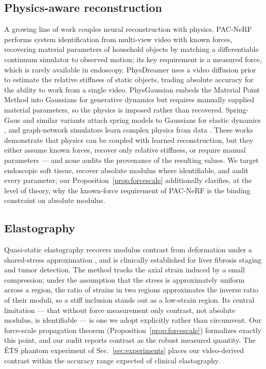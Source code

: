 \documentclass[review]{elsarticle}
\begin{document}
\subsection{Physics-aware reconstruction}
A growing line of work couples neural reconstruction with physics.
PAC-NeRF \citep{pacnerf} performs system identification from multi-view
video with known forces, recovering material parameters of household
objects by matching a differentiable continuum simulator to observed
motion; its key requirement is a measured force, which is rarely available
in endoscopy. PhysDreamer \citep{physdreamer} uses a video diffusion prior
to estimate the relative stiffness of static objects, trading absolute
accuracy for the ability to work from a single video. PhysGaussian
\citep{physgaussian} embeds the Material Point Method into Gaussians for
generative dynamics but requires manually supplied material parameters, so
the physics is imposed rather than recovered. Spring-Gaus and similar
variants attach spring models to Gaussians for elastic dynamics
\citep{springgaus,physicallyembodied}, and graph-network simulators learn
complex physics from data \citep{sanchezgonzalez2020}. These works
demonstrate that physics can be coupled with learned reconstruction, but
they either assume known forces, recover only relative stiffness, or
require manual parameters --- and none audits the provenance of the
resulting values. We target endoscopic soft tissue, recover absolute
modulus where identifiable, and audit every parameter; our
Proposition~\ref{prop:forcescale} additionally clarifies, at the level of
theory, why the known-force requirement of PAC-NeRF is the binding
constraint on absolute modulus.

\subsection{Elastography}
Quasi-static elastography recovers modulus contrast from deformation under
a shared-stress approximation \citep{ophir1991,wells2011,sigrist2017}, and
is clinically established for liver fibrosis staging and tumor detection.
The method tracks the axial strain induced by a small compression; under
the assumption that the stress is approximately uniform across a region,
the ratio of strains in two regions approximates the inverse ratio of their
moduli, so a stiff inclusion stands out as a low-strain region. Its central
limitation --- that without force measurement only contrast, not absolute
modulus, is identifiable --- is one we adopt explicitly rather than
circumvent. Our force-scale propagation theorem
(Proposition~\ref{prop:forcescale}) formalizes exactly this point, and our
audit reports contrast as the robust measured quantity. The \'ETS phantom
experiment of Sec.~\ref{sec:experiments} places our video-derived contrast
within the accuracy range expected of clinical elastography.
\end{document}
